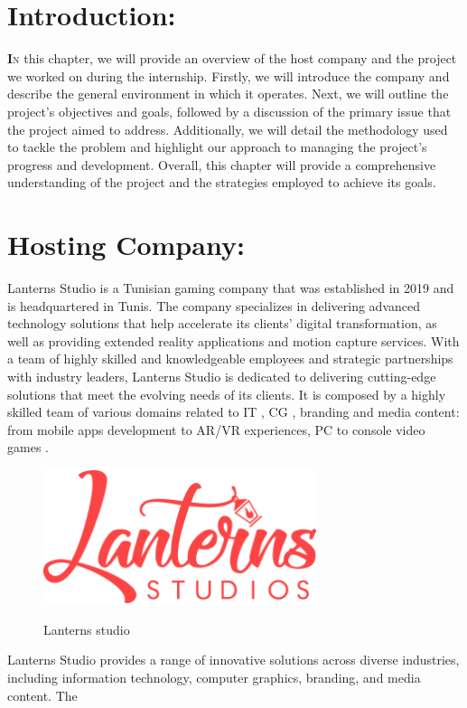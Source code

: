 \documentclass[12pt]{book}
\begin{document}
\section{Introduction:}
\lettrine[findent=1pt]{\textbf{I}}{n} this chapter, we will provide an overview of the host company and the project we
worked on during the internship. Firstly, we will introduce the company and describe the
general environment in which it operates. Next, we will outline the project's objectives and
goals, followed by a discussion of the primary issue that the project aimed to address.
Additionally, we will detail the methodology used to tackle the problem and highlight our
approach to managing the project's progress and development. Overall, this chapter will provide a comprehensive understanding of the project and the strategies employed to achieve its goals.
\section{Hosting Company:}
Lanterns Studio is a Tunisian gaming company that was established in 2019 and is
headquartered in Tunis. The company specializes in delivering advanced technology solutions
that help accelerate its clients' digital transformation, as well as providing extended reality
applications and motion capture services. With a team of highly skilled and knowledgeable
employees and strategic partnerships with industry leaders, Lanterns Studio is dedicated to
delivering cutting-edge solutions that meet the evolving needs of its clients.
It is composed by a highly skilled team of various domains related to IT , CG , branding and media content: from mobile apps development to AR/VR experiences, PC to
console video games \cite{url-1}.
\begin{figure}[!h]
    \centering
    \includegraphics[width=8cm]{./Figures/Images/Lanternslogo.png}\\
    \caption{Lanterns studio}
    \label{Lanterns studio}
\end{figure}
Lanterns Studio provides a range of innovative solutions across diverse industries,
including information technology, computer graphics, branding, and media content. The
\end{document}
